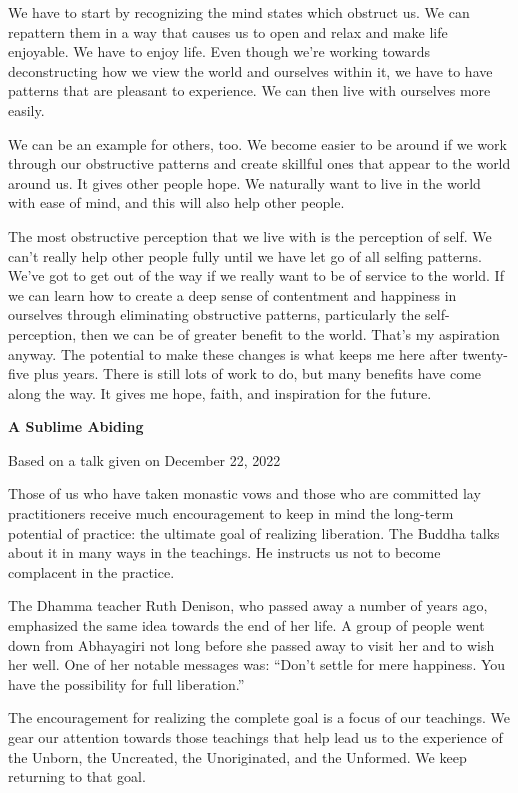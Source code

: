 We have to start by recognizing the mind states which obstruct us. We can repattern them in a way that causes us to open and relax and make life enjoyable. We have to enjoy life. Even though we're working towards deconstructing how we view the world and ourselves within it, we have to have patterns that are pleasant to experience. We can then live with ourselves more easily.~

We can be an example for others, too. We become easier to be around if we work through our obstructive patterns and create skillful ones that appear to the world around us. It gives other people hope. We naturally want to live in the world with ease of mind, and this will also help other people.~

The most obstructive perception that we live with is the perception of self. We can't really help other people fully until we have let go of all selfing patterns. We've got to get out of the way if we really want to be of service to the world. If we can learn how to create a deep sense of contentment and happiness in ourselves through eliminating obstructive patterns, particularly the self-perception, then we can be of greater benefit to the world. That's my aspiration anyway. The potential to make these changes is what keeps me here after twenty-five plus years. There is still lots of work to do, but many benefits have come along the way. It gives me hope, faith, and inspiration for the future.~

\textbf{A Sublime Abiding}

Based on a talk given on December 22, 2022

Those of us who have taken monastic vows and those who are committed lay practitioners receive much encouragement to keep in mind the long-term potential of practice: the ultimate goal of realizing liberation. The Buddha talks about it in many ways in the teachings. He instructs us not to become complacent in the practice.

The Dhamma teacher Ruth Denison, who passed away a number of years ago, emphasized the same idea towards the end of her life. A group of people went down from Abhayagiri not long before she passed away to visit her and to wish her well. One of her notable messages was: ``Don't settle for mere happiness. You have the possibility for full liberation.''

The encouragement for realizing the complete goal is a focus of our teachings. We gear our attention towards those teachings that help lead us to the experience of the Unborn, the Uncreated, the Unoriginated, and the Unformed. We keep returning to that goal.

